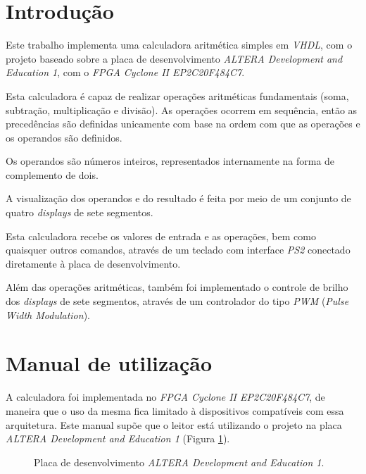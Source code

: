 \documentclass[a4paper,11pt]{article}
\begin{document}

\newpage
\tableofcontents

\newpage
\section{Introdução}

Este trabalho implementa uma calculadora aritmética simples em \textit{VHDL}, com o projeto baseado sobre a placa de desenvolvimento \textit{ALTERA Development and Education 1}, com o \textit{FPGA Cyclone II EP2C20F484C7}.

Esta calculadora é capaz de realizar operações aritméticas fundamentais (soma, subtração, multiplicação e divisão). As operações ocorrem em sequência, então as precedências são definidas unicamente com base na ordem com que as operações e os operandos são definidos.

Os operandos são números inteiros, representados internamente na forma de complemento de dois.

A visualização dos operandos e do resultado é feita por meio de um conjunto de quatro \textit{displays} de sete segmentos.

Esta calculadora recebe os valores de entrada e as operações, bem como quaisquer outros comandos, através de um teclado com interface \textit{PS2} conectado diretamente à placa de desenvolvimento.

Além das operações aritméticas, também foi implementado o controle de brilho dos \textit{displays} de sete segmentos, através de um controlador do tipo \textit{PWM} (\textit{Pulse Width Modulation}).

\newpage
\section{Manual de utilização}

A calculadora foi implementada no \textit{FPGA Cyclone II EP2C20F484C7}, de maneira que o uso da mesma fica limitado à dispositivos compatíveis com essa arquitetura. Este manual supõe que o leitor está utilizando o projeto na placa \textit{ALTERA Development and Education 1} (Figura \ref{fig:altera_de1}).

\begin{figure}[H]
\caption{Placa de desenvolvimento \textit{ALTERA Development and Education 1}.}
\label{fig:altera_de1}
\end{figure}
\end{document}
